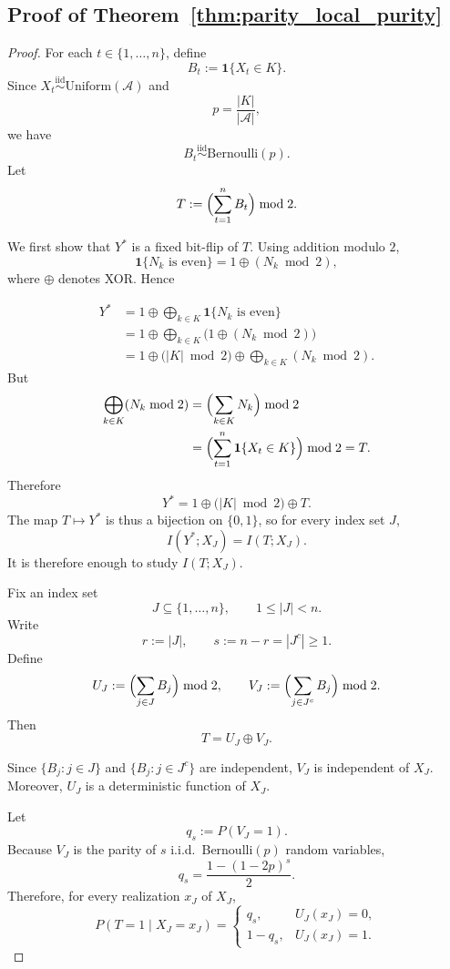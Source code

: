 \documentclass[fullpaper]{nldl}
\theoremstyle{plain}
\theoremstyle{definition}
\theoremstyle{remark}
\begin{document}
\subsection{Proof of Theorem~\ref{thm:parity_local_purity}}
\label{appendix:proof_parity_local_purity}

\begin{proof}
For each \(t\in\{1,\ldots,n\}\), define
\[
B_t := \mathbf{1}\{X_t\in K\}.
\]
Since \(X_t \overset{\mathrm{iid}}{\sim} \mathrm{Uniform}(\mathcal A)\) and
\[
p = \frac{|K|}{|\mathcal A|},
\]
we have
\[
B_t \overset{\mathrm{iid}}{\sim} \mathrm{Bernoulli}(p).
\]
Let
\[
T := \Bigl(\sum_{t=1}^n B_t\Bigr)\bmod 2.
\]

We first show that \(Y^*\) is a fixed bit-flip of \(T\). Using addition modulo \(2\),
\[
\mathbf{1}\{N_k \text{ is even}\} = 1 \oplus (N_k \bmod 2),
\]
where \(\oplus\) denotes XOR. Hence

\begin{align*}
Y^*
&=
1 \oplus\bigoplus_{k\in K} \mathbf{1}\{N_k \text{ is even}\} \\
&=
1 \oplus\bigoplus_{k\in K} \bigl(1 \oplus (N_k \bmod 2)\bigr) \\
&=
1 \oplus\bigl(|K|\bmod 2\bigr)\oplus \bigoplus_{k\in K}(N_k \bmod 2).
\end{align*}
But
\[
\begin{aligned}
\bigoplus_{k\in K}(N_k \bmod 2)
&=
\Bigl(\sum_{k\in K} N_k\Bigr)\bmod 2\\
&=
\Bigl(\sum_{t=1}^n \mathbf{1}\{X_t\in K\}\Bigr)\bmod 2
=
T.
\end{aligned}
\]
Therefore
\[
Y^* = 1 \oplus\bigl(|K|\bmod 2\bigr)\oplus T.
\]
The map \(T\mapsto Y^*\) is thus a bijection on \(\{0,1\}\), so for every index set \(J\),
\[
I(Y^*;X_J)=I(T;X_J).
\]
It is therefore enough to study \(I(T;X_J)\).

Fix an index set
\[
J\subseteq \{1,\ldots,n\},
\qquad 1\le |J|<n.
\]
Write
\[
r := |J|,
\qquad
s := n-r = |J^c| \ge 1.
\]
Define
\[
U_J := \Bigl(\sum_{j\in J} B_j\Bigr)\bmod 2,
\qquad
V_J := \Bigl(\sum_{j\in J^c} B_j\Bigr)\bmod 2.
\]
Then
\[
T = U_J \oplus V_J.
\]

Since \(\{B_j : j\in J\}\) and \(\{B_j : j\in J^c\}\) are independent,
\(V_J\) is independent of \(X_J\). Moreover, \(U_J\) is a deterministic function of
\(X_J\).

Let
\[
q_s := P(V_J=1).
\]
Because \(V_J\) is the parity of \(s\) i.i.d.\ Bernoulli\((p)\) random variables,
\[
q_s = \frac{1-(1-2p)^s}{2}.
\]
Therefore, for every realization \(x_J\) of \(X_J\),
\[
P(T=1\mid X_J=x_J)
=
\begin{cases}
q_s, & U_J(x_J)=0,\\
1-q_s, & U_J(x_J)=1.
\end{cases}
\]


\end{proof}
\end{document}
